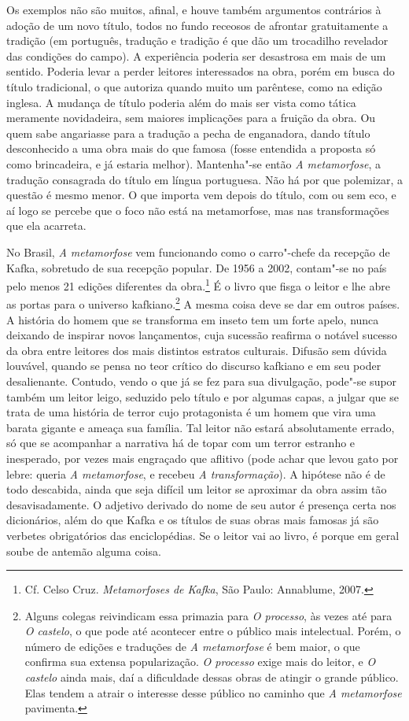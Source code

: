 Os exemplos não são muitos, afinal, e houve também argumentos contrários
à adoção de um novo título, todos no fundo receosos de afrontar
gratuitamente a tradição (em português, tradução e tradição é que dão
um trocadilho revelador das condições do campo). A experiência poderia
ser desastrosa em mais de um sentido. Poderia levar a perder leitores
interessados na obra, porém em busca do título tradicional, o que
autoriza quando muito um parêntese, como na edição inglesa. A
mudança de título poderia além do mais ser vista como tática meramente
novidadeira, sem maiores implicações para a fruição da obra. Ou quem
sabe angariasse para a tradução a pecha de enganadora, dando título
desconhecido a uma obra mais do que famosa (fosse entendida a proposta
só como brincadeira, e já estaria melhor). Mantenha"-se então
\textit{A metamorfose}, a tradução consagrada do título em língua
portuguesa. Não há por que polemizar, a questão é mesmo menor. O que
importa vem depois do título, com ou sem eco, e aí logo se percebe que
o foco não está na metamorfose, mas nas transformações que ela
acarreta.

No Brasil, \textit{A metamorfose} vem funcionando como o carro"-chefe
da recepção de Kafka, sobretudo de sua recepção popular. De 1956 a
2002, contam"-se no país pelo menos 21 edições diferentes da
obra.\footnote{ Cf. Celso Cruz. \textit{Metamorfoses de Kafka}, São
Paulo: Annablume, 2007.} É o livro que fisga o leitor e lhe abre as
portas para o universo kafkiano.\footnote{ Alguns colegas reivindicam
essa primazia para \textit{O processo}, às vezes até para \textit{O
castelo}, o que pode até acontecer entre o público mais intelectual.
Porém, o número de edições e traduções de \textit{A metamorfose} é bem
maior, o que confirma sua extensa popularização. \textit{O processo}
exige mais do leitor, e \textit{O castelo} ainda mais, daí a
dificuldade dessas obras de atingir o grande público. Elas tendem a
atrair o interesse desse público no caminho que \textit{A metamorfose}
pavimenta.} A mesma coisa deve se dar em outros países. A história do
homem que se transforma em inseto tem um forte apelo, nunca deixando de
inspirar novos lançamentos, cuja sucessão reafirma o notável sucesso da
obra entre leitores dos mais distintos estratos culturais. Difusão sem
dúvida louvável, quando se pensa no teor crítico do discurso kafkiano e
em seu poder desalienante. Contudo, vendo o que já se fez para sua
divulgação, pode"-se supor também um leitor leigo, seduzido pelo
título e por algumas capas, a julgar que se trata de uma história de
terror cujo protagonista é um homem que vira uma barata gigante e
ameaça sua família. Tal leitor não estará absolutamente errado, só que
se acompanhar a narrativa há de topar com um terror estranho e
inesperado, por vezes mais engraçado que aflitivo (pode achar que
levou gato por lebre: queria \textit{A metamorfose}, e recebeu
\textit{A transformação}). A hipótese não é de todo descabida, ainda
que seja difícil um leitor se aproximar da obra assim tão
desavisadamente. O adjetivo derivado do nome de seu autor é presença
certa nos dicionários, além do que Kafka e os títulos de suas obras
mais famosas já são verbetes obrigatórios das enciclopédias. Se o
leitor vai ao livro, é porque em geral soube de antemão alguma coisa.

